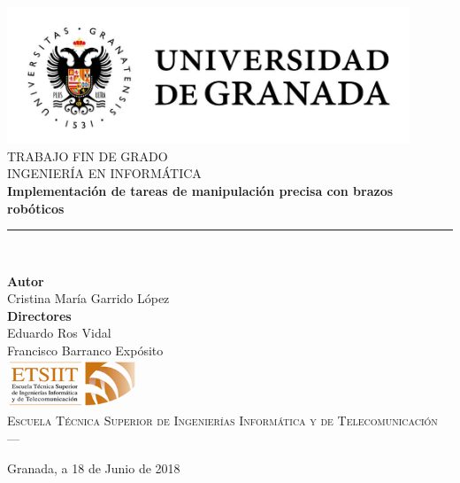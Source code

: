 \begin{titlepage}
 
 
\newlength{\centeroffset}
\setlength{\centeroffset}{-0.5\oddsidemargin}
\addtolength{\centeroffset}{0.5\evensidemargin}
\thispagestyle{empty}

\noindent\hspace*{\centeroffset}\begin{minipage}{\textwidth}

\centering
\includegraphics[width=0.9\textwidth]{imagenes/logo_ugr.jpg}\\[1.4cm]

\textsc{ \Large TRABAJO FIN DE GRADO\\[0.2cm]}
\textsc{ INGENIERÍA EN INFORMÁTICA}\\[1cm]
% 
{\Huge\bfseries Implementación de tareas de manipulación precisa con brazos robóticos\\
}
\noindent\rule[-1ex]{\textwidth}{3pt}\\[3.5ex]
{\large\bfseries }
\end{minipage}

\vspace{1.5cm}
\noindent\hspace*{\centeroffset}\begin{minipage}{\textwidth}
\centering

\textbf{Autor}\\ {Cristina María Garrido López}\\[2.5ex]
\textbf{Directores}\\
{Eduardo Ros Vidal\\
Francisco Barranco Expósito}\\[2cm]
\includegraphics[width=0.3\textwidth]{imagenes/etsiit_logo.png}\\[0.1cm]
\textsc{Escuela Técnica Superior de Ingenierías Informática y de Telecomunicación}\\
\textsc{---}\\
\date{\today}
Granada, a 18 de Junio de 2018 
\end{minipage}
\end{titlepage}


